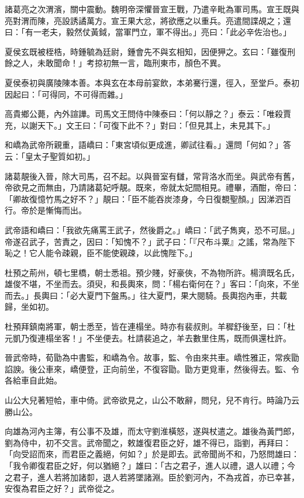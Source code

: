 諸葛亮之次渭濱，關中震動。魏明帝深懼晉宣王戰，乃遣辛毗為軍司馬。宣王既與亮對渭而陳，亮設誘譎萬方。宣王果大忿，將欲應之以重兵。亮遣間諜覘之；還曰：「有一老夫，毅然仗黃鉞，當軍門立，軍不得出。」亮曰：「此必辛佐治也。」

夏侯玄既被桎梏，時鍾毓為廷尉，鍾會先不與玄相知，因便狎之。玄曰：「雖復刑餘之人，未敢聞命！」考掠初無一言，臨刑東市，顏色不異。

夏侯泰初與廣陵陳本善。本與玄在本母前宴飲，本弟騫行還，徑入，至堂戶。泰初因起曰：「可得同，不可得而雜。」

高貴鄉公薨，內外諠譁。司馬文王問侍中陳泰曰：「何以靜之？」泰云：「唯殺賈充，以謝天下。」文王曰：「可復下此不？」對曰：「但見其上，未見其下。」

和嶠為武帝所親重，語嶠曰：「東宮頃似更成進，卿試往看。」還問「何如？」答云：「皇太子聖質如初。」

諸葛靚後入晉，除大司馬，召不起。以與晉室有讎，常背洛水而坐。與武帝有舊，帝欲見之而無由，乃請諸葛妃呼靚。既來，帝就太妃間相見。禮畢，酒酣，帝曰：「卿故復憶竹馬之好不？」靚曰：「臣不能吞炭漆身，今日復覩聖顏。」因涕泗百行。帝於是慚悔而出。

武帝語和嶠曰：「我欲先痛罵王武子，然後爵之。」嶠曰：「武子雋爽，恐不可屈。」帝遂召武子，苦責之，因曰：「知愧不？」武子曰：「『尺布斗粟』之謠，常為陛下恥之！它人能令疎親，臣不能使親疎，以此愧陛下。」

杜預之荊州，頓七里橋，朝士悉祖。預少賤，好豪俠，不為物所許。楊濟既名氏，雄俊不堪，不坐而去。須臾，和長輿來，問：「楊右衛何在？」客曰：「向來，不坐而去。」長輿曰：「必大夏門下盤馬。」往大夏門，果大閱騎。長輿抱內車，共載歸，坐如初。

杜預拜鎮南將軍，朝士悉至，皆在連榻坐。時亦有裴叔則。羊穉舒後至，曰：「杜元凱乃復連榻坐客！」不坐便去。杜請裴追之，羊去數里住馬，既而俱還杜許。

晉武帝時，荀勖為中書監，和嶠為令。故事，監、令由來共車。嶠性雅正，常疾勖諂諛。後公車來，嶠便登，正向前坐，不復容勖。勖方更覓車，然後得去。監、令各給車自此始。

山公大兒著短帢，車中倚。武帝欲見之，山公不敢辭，問兒，兒不肯行。時論乃云勝山公。

向雄為河內主簿，有公事不及雄，而太守劉淮橫怒，遂與杖遣之。雄後為黃門郎，劉為侍中，初不交言。武帝聞之，敕雄復君臣之好，雄不得已，詣劉，再拜曰：「向受詔而來，而君臣之義絕，何如？」於是即去。武帝聞尚不和，乃怒問雄曰：「我令卿復君臣之好，何以猶絕？」雄曰：「古之君子，進人以禮，退人以禮；今之君子，進人若將加諸厀，退人若將墜諸淵。臣於劉河內，不為戎首，亦已幸甚，安復為君臣之好？」武帝從之。

